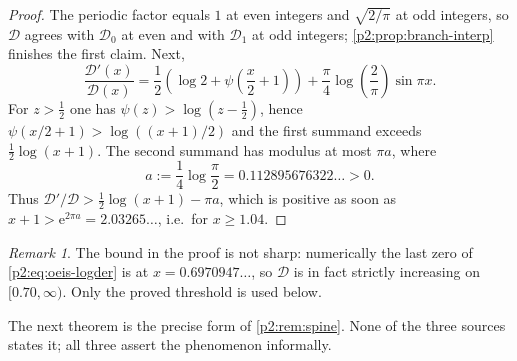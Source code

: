 \documentclass[11pt,a4paper,oneside]{book}
\theoremstyle{plain}
\theoremstyle{definition}
\theoremstyle{remark}
\newtheorem{remark}[theorem]{Remark}
\newcommand{\e}{\mathrm{e}}
\begin{document}
\begin{proof}
The periodic factor equals \(1\) at even integers and \(\sqrt{2/\pi}\) at odd
integers, so \(\mathscr D\) agrees with \(\mathcal D_0\) at even and with
\(\mathcal D_1\) at odd integers; \cref{p2:prop:branch-interp} finishes the
first claim.  Next,
\begin{equation}
 \frac{\mathscr D'(x)}{\mathscr D(x)}
 =\frac12\left(\log2+\psi\!\left(\frac x2+1\right)\right)
 +\frac\pi4\log\!\left(\frac2\pi\right)\sin\pi x .
 \label{p2:eq:oeis-logder}
\end{equation}
For \(z>\tfrac12\) one has \(\psi(z)>\log\!\left(z-\tfrac12\right)\), hence
\(\psi(x/2+1)>\log\!\left((x+1)/2\right)\) and the first summand exceeds
\(\tfrac12\log(x+1)\).  The second summand has modulus at most
\(\pi a\), where
\begin{equation}
 a:=\frac14\log\frac\pi2=0.112895676322\ldots>0 .
 \label{p2:eq:a-def}
\end{equation}
Thus \(\mathscr D'/\mathscr D>\tfrac12\log(x+1)-\pi a\), which is positive as
soon as \(x+1>\e^{2\pi a}=2.03265\ldots\), i.e.\ for \(x\ge1.04\).
\end{proof}

\begin{remark}
The bound in the proof is not sharp: numerically the last zero of
\cref{p2:eq:oeis-logder} is at \(x=0.6970947\ldots\), so \(\mathscr D\) is in
fact strictly increasing on \([0.70,\infty)\).  Only the proved threshold is
used below.
\end{remark}

The next theorem is the precise form of \cref{p2:rem:spine}.  None of the three
sources states it; all three assert the phenomenon informally.
\end{document}

